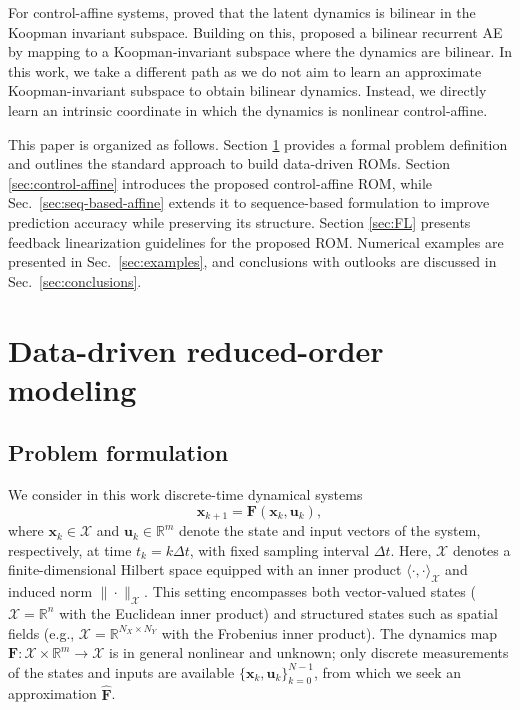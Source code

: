 \documentclass{article}
\begin{document}
For control-affine systems, \cite{peitz2020data} proved that the latent dynamics is bilinear in the Koopman invariant subspace.
Building on this, \cite{chakrabarti2025temporally} proposed a bilinear recurrent AE by mapping to a Koopman-invariant subspace where the dynamics are bilinear.
In this work, we take a different path as we do not aim to learn an approximate Koopman-invariant subspace to obtain bilinear dynamics.
Instead, we directly learn an intrinsic coordinate in which the dynamics is nonlinear control-affine.

This paper is organized as follows.
Section \ref{sec:modeling} provides a formal problem definition and outlines the standard approach to build data-driven ROMs.
Section \ref{sec:control-affine} introduces the proposed control-affine ROM, while Sec.~\ref{sec:seq-based-affine} extends it to sequence-based formulation to improve prediction accuracy while preserving its structure.
Section \ref{sec:FL} presents feedback linearization guidelines for the proposed ROM.
Numerical examples are presented in Sec.~\ref{sec:examples}, and conclusions with outlooks are discussed in Sec.~\ref{sec:conclusions}.




\section{Data-driven reduced-order modeling}
\label{sec:modeling}
\subsection{Problem formulation}
We consider in this work discrete-time dynamical systems
\begin{equation}
\label{eq:high-dim-dyn}
    \mathbf{x}_{k+1} = \mathbf{F}(\mathbf{x}_k,\mathbf{u}_k),
\end{equation}
where $\mathbf{x}_k \in \mathcal{X}$ and $\mathbf{u}_k\in \mathbb{R}^m$ denote the state and input vectors of the system, respectively, at time $t_k=k\Delta t$, with fixed sampling interval $\Delta t$.
Here, $\mathcal{X}$ denotes a finite-dimensional Hilbert space equipped with an inner product $\langle\cdot,\cdot\rangle_{\mathcal{X}}$ and induced norm $\|\cdot\|_{\mathcal{X}}$.
This setting encompasses both vector-valued states ($\mathcal{X} = \mathbb{R}^n$ with the Euclidean inner product) and structured states such as spatial fields (e.g., $\mathcal{X} = \mathbb{R}^{N_X \times N_Y}$ with the Frobenius inner product).
The dynamics map $\mathbf{F}: \mathcal{X} \times \mathbb{R}^m \rightarrow \mathcal{X}$ is in general nonlinear and unknown; only discrete measurements of the states and inputs are available $\{\mathbf{x}_k, \mathbf{u}_k\}_{k=0}^{N-1}$, from which we seek an approximation $\hat{\mathbf{F}}$.
\end{document}
